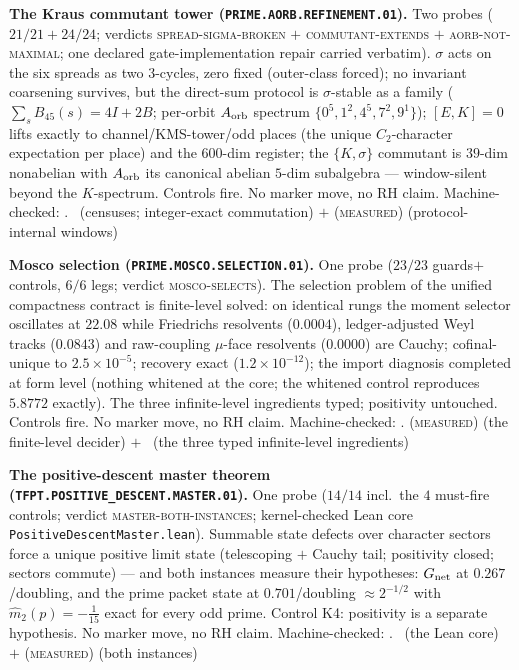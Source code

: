 \documentclass[11pt,a4paper]{article}
\theoremstyle{definition}
\begin{document}
\par\smallskip\noindent\textbf{The Kraus commutant tower
(\texttt{PRIME.AORB.REFINEMENT.01}).}
Two probes ($21/21+24/24$; verdicts \textsc{spread-sigma-broken}
$+$ \textsc{commutant-extends} $+$ \textsc{aorb-not-maximal}; one
declared gate-implementation repair carried verbatim).  $\sigma$
acts on the six spreads as two 3-cycles, zero fixed (outer-class
forced); no invariant coarsening survives, but the direct-sum
protocol is $\sigma$-stable as a family ($\sum_s B_{45}(s)=4I+2B$;
per-orbit $A_{\rm orb}$ spectrum $\{0^5,1^2,4^5,7^2,9^1\}$);
$[E,K]=0$ lifts exactly to channel/KMS-tower/odd places (the
unique $C_2$-character expectation per place) and the $600$-dim
register; the $\{K,\sigma\}$ commutant is $39$-dim nonabelian with
$A_{\rm orb}$ its canonical abelian $5$-dim subalgebra ---
window-silent beyond the $K$-spectrum.  Controls fire.  No marker
move, no RH claim.
Machine-checked: .
\mE\ (censuses; integer-exact commutation) $+$ (\textsc{measured})
(protocol-internal windows)
\par\smallskip

\par\smallskip\noindent\textbf{Mosco selection
(\texttt{PRIME.MOSCO.SELECTION.01}).}
One probe ($23/23$ guards$+$controls, $6/6$ legs; verdict
\textsc{mosco-selects}).  The selection problem of the unified
compactness contract is finite-level solved: on identical rungs
the moment selector oscillates at $22.08$ while Friedrichs
resolvents ($0.0004$), ledger-adjusted Weyl tracks ($0.0843$) and
raw-coupling $\mu$-face resolvents ($0.0000$) are Cauchy;
cofinal-unique to $2.5\times10^{-5}$; recovery exact
($1.2\times10^{-12}$); the import diagnosis completed at form
level (nothing whitened at the core; the whitened control
reproduces $5.8772$ exactly).  The three infinite-level
ingredients typed; positivity untouched.  Controls fire.  No
marker move, no RH claim.
Machine-checked: .
(\textsc{measured}) (the finite-level decider) $+$ \mO\ (the three
typed infinite-level ingredients)
\par\smallskip

\par\smallskip\noindent\textbf{The positive-descent master theorem
(\texttt{TFPT.POSITIVE\_DESCENT.MASTER.01}).}
One probe ($14/14$ incl.\ the $4$ must-fire controls; verdict
\textsc{master-both-instances}; kernel-checked Lean core
\texttt{PositiveDescentMaster.lean}).  Summable state defects over
character sectors force a unique positive limit state (telescoping
$+$ Cauchy tail; positivity closed; sectors commute) --- and both
instances measure their hypotheses: $G_{\rm net}$ at
$0.267$/doubling, and the prime packet state at $0.701$/doubling
$\approx2^{-1/2}$ with $\hat m_2(p)=-\tfrac1{15}$ exact for every
odd prime.  Control K4: positivity is a separate hypothesis.
No marker move, no RH claim.
Machine-checked: .
\mE\ (the Lean core) $+$ (\textsc{measured}) (both instances)
\par\smallskip
\end{document}
